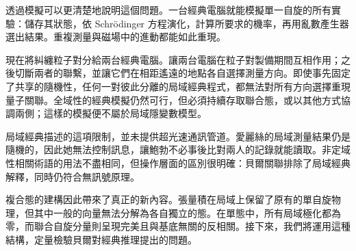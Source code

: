\begin{classroomqa}
\end{classroomqa}

透過模擬可以更清楚地說明這個問題。一台經典電腦就能模擬單一自旋的所有實驗：儲存其狀態，依 Schr\"odinger 方程演化，計算所要求的機率，再用亂數產生器選出結果。重複測量與磁場中的進動都能如此重現。

現在將糾纏粒子對分給兩台經典電腦。讓兩台電腦在粒子對製備期間互相作用；之後切斷兩者的聯繫，並讓它們在相距遙遠的地點各自選擇測量方向。即使事先固定了共享的隨機性，任何一對彼此分離的局域經典程式，都無法對所有方向選擇重現量子關聯。全域性的經典模擬仍然可行，但必須持續存取聯合態，或以其他方式協調兩側；這樣的模擬便不屬於局域隱變數模型。

局域經典描述的這項限制，並未提供超光速通訊管道。愛麗絲的局域測量結果仍是隨機的，因此她無法控制訊息，讓鮑勃不必事後比對兩人的記錄就能讀取。非定域性相關術語的用法不盡相同，但操作層面的區別很明確：貝爾關聯排除了局域經典解釋，同時仍符合無訊號原理。

複合態的建構因此帶來了真正的新內容。張量積在局域上保留了原有的單自旋物理，但其中一般的向量無法分解為各自獨立的態。在單態中，所有局域極化都為零，而聯合自旋分量則呈現完美且與基底無關的反相關。接下來，我們將運用這種結構，定量檢驗貝爾對經典推理提出的問題。
